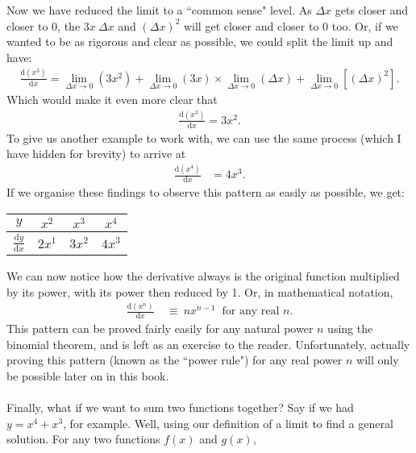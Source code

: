 \documentclass[11pt]{article}
\numberwithin{equation}{section}
\begin{document}
Now we have reduced the limit to a ``common sense" level. As \(\Delta x\) gets closer and closer to 0, the \(3x \ \Delta x\) and \((\Delta x)^2\) will get closer and closer to 0 too. Or, if we wanted to be as rigorous and clear as possible, we could split the limit up and have:
\begin{align*}
\frac{\textrm{d}(x^3)}{\textrm{d}x} = \lim_{\Delta x \to 0} (3x^2) + \lim_{\Delta x \to 0} (3x) \times \lim_{\Delta x \to 0} (\Delta x) + \lim_{\Delta x \to 0} \left[(\Delta x)^2\right].
\end{align*}
Which would make it even more clear that
\begin{align*}
\frac{\textrm{d}(x^3)}{\textrm{d}x} = 3x^2.
\end{align*}
To give us another example to work with, we can use the same process (which I have hidden for brevity) to arrive at
\begin{align*}
\frac{\textrm{d}(x^4)}{\textrm{d}x} &= 4x^3.
\end{align*}
If we organise these findings to observe this pattern as easily as possible, we get:
\begin{center}
\begin{tabular}{||c|c|c|c||}
\hline
\(y\) & \(x^2\) & \(x^3\) & \(x^4\) \\
\hline
\(\frac{\textrm{d}y}{\textrm{d}x}\) & \(2x^1\) & \(3x^2\) & \(4x^3\) \\ 
\hline
\end{tabular}
\end{center}
We can now notice how the derivative always is the original function multiplied by its power, with its power then reduced by 1. Or, in mathematical notation,
\begin{align*}
\frac{\textrm{d}(x^n)}{\textrm{d}x} & \ \equiv \ nx^{n-1} \ \textrm{ for any real } n.
\end{align*}
This pattern can be proved fairly easily for any natural power \(n\) using the binomial theorem, and is left as an exercise to the reader. Unfortunately, actually proving this pattern (known as the ``power rule") for any real power \(n\) will only be possible later on in this book.
\\ \\ Finally, what if we want to sum two functions together? Say if we had \(y = x^4 + x^3 \), for example. Well, using our definition of a limit to find a general solution. For any two functions \(f(x)\) and \(g(x)\), 
\end{document}
